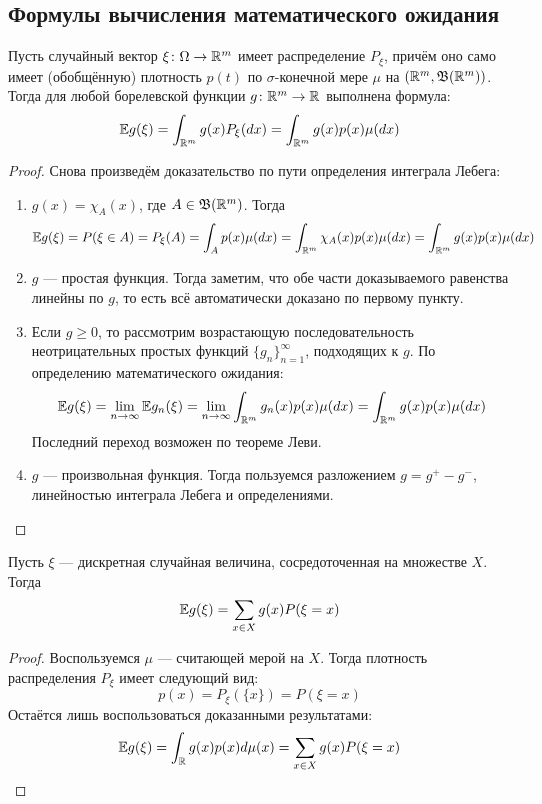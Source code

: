 \subsection{Формулы вычисления математического ожидания}

\begin{theorem}
	Пусть случайный вектор $\xi \colon \Omega \to \mathbb{R}^m$ имеет распределение $P_\xi$, причём оно само имеет (обобщённую) плотность $p(t)$ по $\sigma$-конечной мере $\mu$ на $(\mathbb{R}^m, \mathfrak{B}(\mathbb{R}^m))$. Тогда для любой борелевской функции $g \colon \mathbb{R}^m \to \mathbb{R}$ выполнена формула:
	\[
	\mathbb{E} g(\xi) = \int_{\mathbb{R}^m} g(x)P_\xi(dx) = \int_{\mathbb{R}^m} g(x)p(x)\mu(dx)
	\]
\end{theorem}

\begin{proof}
	Снова произведём доказательство по пути определения интеграла Лебега:
	\begin{enumerate}
		\item $g(x) =\chi_A(x)$, где $A \in \mathfrak{B}(\mathbb{R}^m)$. Тогда
		\[
			\mathbb{E} g(\xi) = P(\xi \in A) = P_\xi(A) = \int_A p(x)\mu(dx) = \int_{\mathbb{R}^m} \chi_A(x)p(x)\mu(dx) = \int_{\mathbb{R}^m} g(x)p(x)\mu(dx)
		\]
		
		\item $g$ --- простая функция. Тогда заметим, что обе части доказываемого равенства линейны по $g$, то есть всё автоматически доказано по первому пункту.
		
		\item Если $g \ge 0$, то рассмотрим возрастающую последовательность неотрицательных простых функций $\{g_n\}_{n = 1}^\infty$, подходящих к $g$. По определению математического ожидания:
		\[
			\mathbb{E} g(\xi) = \lim_{n \to \infty} \mathbb{E} g_n(\xi) = \lim_{n \to \infty} \int_{\mathbb{R}^m} g_n(x)p(x)\mu(dx) = \int_{\mathbb{R}^m} g(x)p(x)\mu(dx)
		\]
		Последний переход возможен по теореме Леви.
		
		\item $g$ --- произвольная функция. Тогда пользуемся разложением $g = g^+ - g^-$, линейностью интеграла Лебега и определениями.
	\end{enumerate}
\end{proof}

\begin{corollary}
	Пусть $\xi$ --- дискретная случайная величина, сосредоточенная на множестве $X$. Тогда
	\[
		\mathbb{E} g(\xi) = \sum_{x \in X} g(x)P(\xi = x)
	\]
\end{corollary}

\begin{proof}
	Воспользуемся $\mu$ --- считающей мерой на $X$. Тогда плотность распределения $P_\xi$ имеет следующий вид:
	\[
		p(x) = P_\xi(\{x\}) = P(\xi = x)
	\]
	Остаётся лишь воспользоваться доказанными результатами:
	\[
		\mathbb{E} g(\xi) = \int_{\mathbb{R}} g(x)p(x)d\mu(x) = \sum_{x \in X} g(x)P(\xi = x)
	\]
\end{proof}

